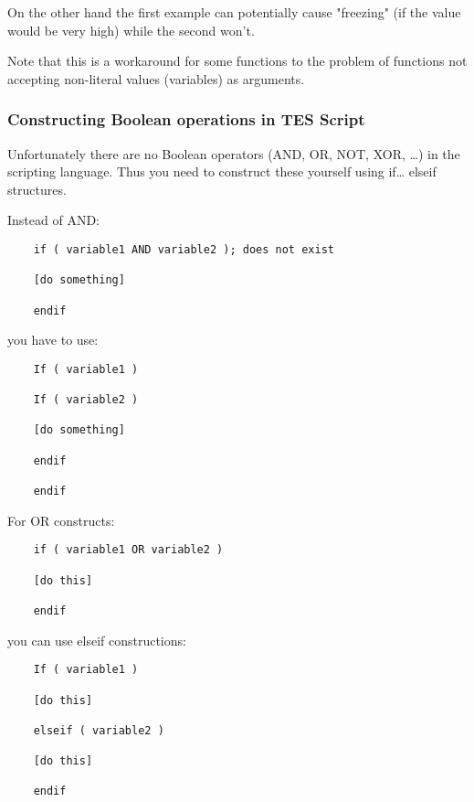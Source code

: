 On the other hand the first example can potentially cause "freezing" (if
the value would be very high) while the second won't.

Note that this is a workaround for some functions to the problem of
functions not accepting non-literal values (variables) as arguments.

\hypertarget{constructing-boolean-operations-in-tes-script}{%
\subsubsection{Constructing Boolean operations in TES
Script}\label{constructing-boolean-operations-in-tes-script}}

Unfortunately there are no Boolean operators (AND, OR, NOT, XOR, \ldots)
in the scripting language. Thus you need to construct these yourself
using if\ldots{} elseif structures.

Instead of AND:

\begin{lstlisting}
	if ( variable1 AND variable2 ); does not exist
	
	[do something]
	
	endif
\end{lstlisting}
	
you have to use:

\begin{lstlisting}	
	If ( variable1 )
	
	If ( variable2 )
	
	[do something]
	
	endif
	
	endif
\end{lstlisting}
	
For OR constructs:

\begin{lstlisting}	
	if ( variable1 OR variable2 )
	
	[do this]
	
	endif
\end{lstlisting}
	
you can use elseif constructions:

\begin{lstlisting}	
	If ( variable1 )
	
	[do this]
	
	elseif ( variable2 )
	
	[do this]
	
	endif
\end{lstlisting}